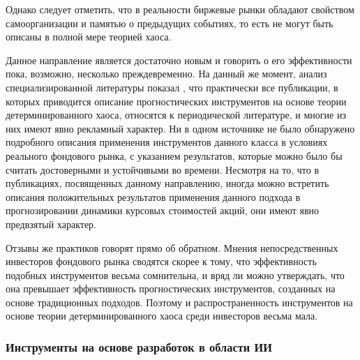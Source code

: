 \par Однако следует отметить, что в реальности биржевые рынки обладают свойством самоорганизации и памятью о предыдущих событиях, то есть не могут быть описаны в полной
мере теорией хаоса.

\par Данное направление является достаточно новым и говорить о его эффективности
пока, возможно, несколько преждевременно. На данный же момент, анализ
специализированной литературы показал \cite{chaos}, что практически все публикации, в которых
приводится описание прогностических инструментов на основе теории
детерминированного хаоса, относятся к периодической литературе, и многие из них
имеют явно рекламный характер. Ни в одном источнике не было обнаружено подробного
описания применения инструментов данного класса в условиях реального фондового
рынка, с указанием результатов, которые можно было бы считать достоверными и
устойчивыми во времени. Несмотря на то, что в публикациях, посвященных данному
направлению, иногда можно встретить описания положительных результатов применения
данного подхода в прогнозировании динамики курсовых стоимостей акций, они имеют
явно предвзятый характер.

\par Отзывы же практиков говорят прямо об обратном. Мнения непосредственных
инвесторов фондового рынка сводятся скорее к тому, что эффективность подобных
инструментов весьма сомнительна, и вряд ли можно утверждать, что она превышает
эффективность прогностических инструментов, созданных на основе традиционных
подходов. Поэтому и распространенность инструментов на основе теории
детерминированного хаоса среди инвесторов весьма мала.

\subsubsection{Инструменты на основе разработок в области ИИ}

